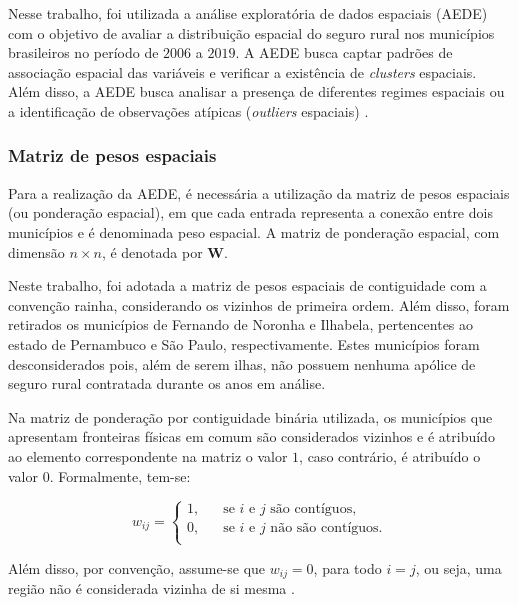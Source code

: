 Nesse trabalho, foi utilizada a análise exploratória de dados espaciais (AEDE) com o objetivo de avaliar a distribuição espacial do seguro rural nos municípios brasileiros no período de $2006$ a $2019$. A AEDE busca captar padrões de associação espacial das variáveis e verificar a existência de \textit{clusters} espaciais. Além disso, a AEDE busca analisar a presença de diferentes regimes espaciais ou a identificação de observações atípicas (\textit{outliers} espaciais) \cite{almeida12_2}.

\subsubsection{Matriz de pesos espaciais}

Para a realização da AEDE, é necessária a utilização da matriz de pesos espaciais (ou ponderação espacial), em que cada entrada representa a conexão entre dois municípios e é denominada peso espacial. A matriz de ponderação espacial, com dimensão $n \times n$, é denotada por $\boldsymbol{W}$. 

Neste trabalho, foi adotada a matriz de pesos espaciais de contiguidade com a convenção rainha, considerando os vizinhos de primeira ordem. Além disso, foram retirados os municípios de Fernando de Noronha e Ilhabela, pertencentes ao estado de Pernambuco e São Paulo, respectivamente. Estes municípios foram desconsiderados pois, além de serem ilhas, não possuem nenhuma apólice de seguro rural contratada durante os anos em análise.

Na matriz de ponderação por contiguidade binária utilizada, os municípios que apresentam fronteiras físicas em comum são considerados vizinhos e é atribuído ao elemento correspondente na matriz o valor $1$, caso contrário, é atribuído o valor $0$. Formalmente, tem-se:
	
\begin{equation*}
    w_{ij} = 
    	\begin{cases}
        	\text{1,} & \quad\text{se $i$ e $j$ são contíguos}, \\
    	    \text{0,} & \quad\text{se $i$ e $j$ não são contíguos.}\\
    	\end{cases}
\end{equation*}

	
\noindent Além disso, por convenção, assume-se que  $w_{ij} =  0$, para todo $i = j$, ou seja, uma região não é considerada vizinha de si mesma \cite{almeida12_2}. 

